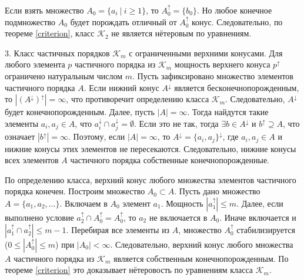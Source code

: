 \documentclass[12pt]{article}
\theoremstyle{break}
\def\K{\mathcal{K}_m}
\begin{document}
		Если взять множество $A_0 = \{a_i~|~i\geqslant 1\}$, то $A_0^{\uparrow} = \{b_0\}$. Но любое конечное подмножество $A_0$ будет порождать отличный от $A_0^{\uparrow}$ конус. Следовательно, по теореме \ref{criterion}, класс $\mathcal{K}_2$ не является нётеровым по уравнениям.

		3. Класс частичных порядков $\K$ с ограниченными верхними конусами. Для любого элемента $p$ частичного порядка из $\K$ мощность верхнего конуса $p^{\uparrow}$ ограничено натуральным числом $m$. Пусть зафиксировано множество элементов частичного порядка $A$. Если нижний конус $A^{\downarrow}$ является бесконечнопорожденным, то $|(A^{\downarrow})^{\uparrow}| = \infty$, что противоречит определению класса $\K$. Следовательно, $A^{\downarrow}$ будет конечнопорожденным. Далее, пусть $|A| = \infty$. Тогда найдутся такие элементы $a_{i}, a_{j}\in A$, что $a_{i}^{\downarrow} \cap a_{j}^{\downarrow} = \emptyset$. Если это не так, тогда $\exists b\in A^{\downarrow}$ и $b^{\uparrow} \supseteq A$, что означает $|b^{\uparrow}| = \infty$. Поэтому, если $|A|=\infty$, то $A^{\downarrow} = \{a_i, a_j\}^{\downarrow}$, где $a_i, a_j\in A$ и нижние конусы этих элементов не пересекаются. Следовательно, нижние конусы всех элементов $A$ частичного порядка собственные конечнопорожденные.

		По определению класса, верхний конус любого множества элементов частичного порядка конечен. Построим множество $A_0\subset A$. Пусть дано множество $A = \{a_1, a_2,\dots\}.$ Включаем в $A_0$ элемент $a_1$. Мощность $|a_1^{\uparrow}| \leqslant m.$ Далее, если выполнено условие $a_2^{\uparrow} \cap A_0^{\uparrow} = A_0^{\uparrow}$, то $a_2$ не включается в $A_0$. Иначе включается и $|a_1^{\uparrow} \cap a_2^{\uparrow}| \leqslant m-1$. Перебирая все элементы из $A$, множество $A_0^{\uparrow}$ стабилизируется ($0 \leqslant |A_0^{\uparrow}| \leqslant m$) при $|A_0|<\infty$. Следовательно, верхний конус любого множества $A$ частичного порядка из $\K$ является собственным конечнопорожденным. По теореме \ref{criterion} это доказывает нётеровость по уравнениям класса $\K$.
	
\end{document}

